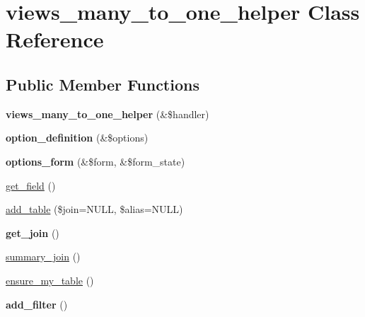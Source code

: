 \hypertarget{classviews__many__to__one__helper}{
\section{views\_\-many\_\-to\_\-one\_\-helper Class Reference}
\label{classviews__many__to__one__helper}
}
\subsection*{Public Member Functions}
\begin{CompactItemize}
\item 
\hypertarget{classviews__many__to__one__helper_58c262d5acd10448d1e8c622a289e686}{
\textbf{views\_\-many\_\-to\_\-one\_\-helper} (\&\$handler)}
\label{classviews__many__to__one__helper_58c262d5acd10448d1e8c622a289e686}

\item 
\hypertarget{classviews__many__to__one__helper_a9f5410d3956985218d6da5493b78bfe}{
\textbf{option\_\-definition} (\&\$options)}
\label{classviews__many__to__one__helper_a9f5410d3956985218d6da5493b78bfe}

\item 
\hypertarget{classviews__many__to__one__helper_5eb7db6defcb30765c434f14a6b5259f}{
\textbf{options\_\-form} (\&\$form, \&\$form\_\-state)}
\label{classviews__many__to__one__helper_5eb7db6defcb30765c434f14a6b5259f}

\item 
\hyperlink{classviews__many__to__one__helper_f428c1a384a446883d9c862e1a5a35d1}{get\_\-field} ()
\item 
\hyperlink{classviews__many__to__one__helper_0d8f88cfcc6bbb792c0fd0b3e1f42882}{add\_\-table} (\$join=NULL, \$alias=NULL)
\item 
\hypertarget{classviews__many__to__one__helper_fe4279ec96cff8444484a61fbfbf77ed}{
\textbf{get\_\-join} ()}
\label{classviews__many__to__one__helper_fe4279ec96cff8444484a61fbfbf77ed}

\item 
\hyperlink{classviews__many__to__one__helper_3cca1469412856288fcbaa5c1f627192}{summary\_\-join} ()
\item 
\hyperlink{classviews__many__to__one__helper_5fdd8b532ced88b77fdd90fdb69e1ced}{ensure\_\-my\_\-table} ()
\item 
\hypertarget{classviews__many__to__one__helper_5db83dd480f8a32940cb60833fa785bc}{
\textbf{add\_\-filter} ()}
\label{classviews__many__to__one__helper_5db83dd480f8a32940cb60833fa785bc}

\end{CompactItemize}


